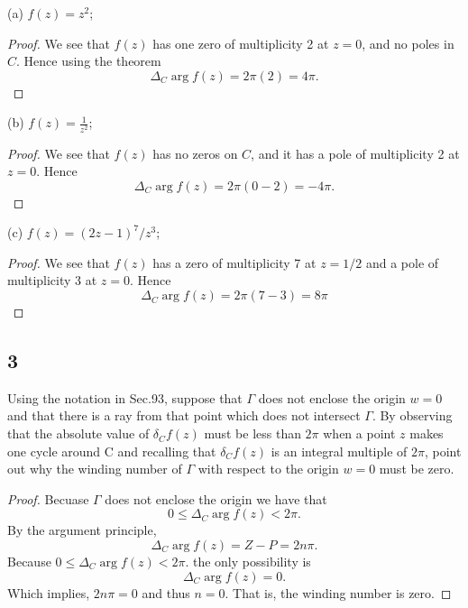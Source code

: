 \documentclass{article}
\begin{document}
(a) $f(z) = z^2$;
\begin{proof}
    We see that $f(z)$ has one zero of multiplicity 2 at $z = 0$, and no poles
    in $C$. Hence using the theorem
    \begin{equation*}
        \Delta_C\arg f(z) = 2\pi(2) = 4\pi.
    \end{equation*}
\end{proof}

(b) $f(z) = \frac{1}{z^2}$;
\begin{proof}
    We see that $f(z)$ has no zeros on $C$, and it has a pole of multiplicity 2
    at $z = 0$.
    Hence
    \begin{equation*}
        \Delta_C \arg f(z) = 2\pi (0-2) = -4\pi.
    \end{equation*}
\end{proof}

(c) $f(z) = (2z-1)^7 / z^3$;
\begin{proof}
    We see that $f(z)$ has a zero of multiplicity 7 at $z=1/2$ and a pole of multiplicity
    3 at $z=0$. Hence
    \begin{equation*}
        \Delta_C \arg f(z) = 2\pi (7-3) = 8\pi
    \end{equation*}
\end{proof}

\subsection*{3}
Using the notation in Sec.93, suppose that $\Gamma$ does not enclose the origin
$w=0$ and that there is a ray from that point which does not intersect $\Gamma$.
By observing that the absolute value of $\delta_C f(z)$ must be less than $2\pi$
when a point $z$ makes one cycle around C and recalling that $\delta_C f(z)$
is an integral multiple of $2\pi$, point out why the winding number of $\Gamma$
with respect to the origin $w=0$ must be zero.

\begin{proof}
    Becuase $\Gamma$ does not enclose the origin we have that
    \begin{equation*}
        0 \leq \Delta_C \arg f(z) < 2\pi.
    \end{equation*}
    By the argument principle,
    \begin{equation*}
        \Delta_C \arg f(z) = Z- P = 2n\pi.
    \end{equation*}
    Because $0 \leq \Delta_C \arg f(z) < 2\pi$. the only possibility is
    \begin{equation*}
        \Delta_C \arg f(z) = 0.
    \end{equation*}
    Which implies, $2n\pi =0$ and thus $n= 0$. That is, the winding number is zero.
\end{proof}
\end{document}
